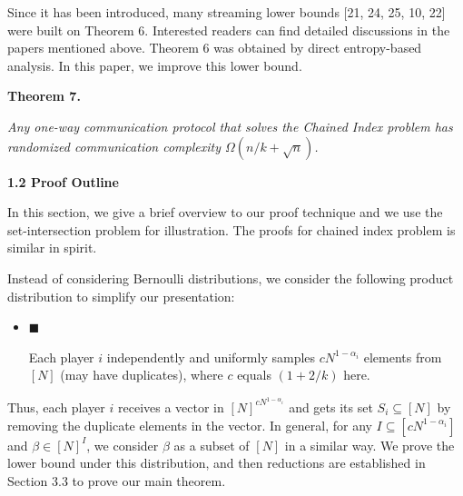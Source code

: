 Since it has been introduced, many streaming lower bounds [21, 24, 25, 10, 22] were built on Theorem 6. Interested readers can find detailed discussions in the papers mentioned above. Theorem 6 was obtained by direct entropy-based analysis. In this paper, we improve this lower bound.\par





\par\medskip\noindent\textbf{
\textbf{Theorem 7}\textbf{.}
}\par



\emph{Any one-way communication protocol that solves the Chained Index problem has randomized communication complexity $\Omega(n/k+\sqrt{n})$.}\par








\par\medskip\noindent\textbf{
1.2 Proof Outline}\par




In this section, we give a brief overview to our proof technique and we use the set-intersection problem for illustration. The proofs for chained index problem is similar in spirit.\par




Instead of considering Bernoulli distributions, we consider the following product distribution to simplify our presentation:\par


\begin{itemize}


\item[] 
$\blacksquare$ 


Each player $i$ independently and uniformly samples $cN^{1-\alpha_{i}}$ elements from $[N]$ (may have duplicates), where $c$ equals $(1+2/k)$ here.\par





\end{itemize}


Thus, each player $i$ receives a vector in $[N]^{cN^{1-\alpha_{i}}}$ and gets its set $S_{i}\subseteq[N]$ by removing the duplicate elements in the vector. In general, for any $I\subseteq[cN^{1-\alpha_{i}}]$ and $\beta\in[N]^{I}$, we consider $\beta$ as a subset of $[N]$ in a similar way. We prove the lower bound under this distribution, and then reductions are established in Section 3.3 to prove our main theorem.\par




